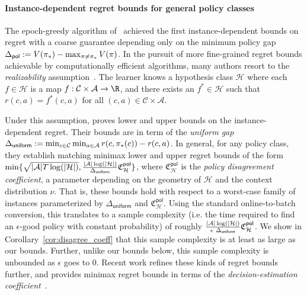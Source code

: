 \documentclass{article}
\newcommand{\mc}[1]{\mathcal{#1}}
\newcommand{\1}{\mathbf{1}}
\renewcommand{\v}{r} %
\begin{document}
\paragraph{Instance-dependent regret bounds for general policy classes}
The epoch-greedy algorithm of~\cite{langford2007epoch} achieved the first instance-dependent bounds on regret with a coarse guarantee depending only on the minimum policy gap 
$\Delta_{\sf pol} := V(\pi_{\ast}) - \max_{\pi \neq \pi_{\ast}}V(\pi)$.
In the pursuit of more fine-grained regret bounds achievable by computationally efficient algorithms, many authors resort to the 
\textit{realizability} assumption~\cite{foster2018practical, foster2020beyond,simchi2021bypassing, foster2021instance}.
The learner knows a hypothesis class $\mc{H}$ where each $f \in \mc{H}$ is a map $f: \mc{C} \times \mc{A} \rightarrow \R$,
and there exists an  $f^{\ast}\in\mc{H}$ such that $\v(c,a) = f^{\ast}(c,a)$ for all $(c,a) \in \mc{C} \times \mc{A}$. 

Under this assumption, \cite{foster2021instance} proves lower and upper bounds on the instance-dependent regret. Their bounds are in term of the \textit{uniform gap} $\Delta_{\sf uniform} := \min_{c\in \mc{C}} \min_{a \in \mc{A}} \v(c,\pi_{\ast}(c)) - \v(c,a)$. 
In general, for any policy class, they establish matching minimax lower and upper regret bounds of the form $\min\{\sqrt{|\mathcal{A}|T\log(|\mc{H}|)}, \frac{|\mc{A}| \log( |\mc{H}|)}{\Delta_{\sf uniform}} \mathfrak{C}_{\mc{H}}^{\mathsf{pol}}\}$, 
where $\mathfrak{C}_{\mc{H}}^{\mathsf{pol}}$ is the \textit{policy disagreement coefficient}, a parameter depending on the geometry of $\mc{H}$ and the context distribution $\nu$. 
That is, these bounds hold with respect to a worst-case family of instances parameterized by $\Delta_{\textsf{uniform}}$ and $\mathfrak{C}_{\mc{H}}^{\mathsf{pol}}$.
Using the standard online-to-batch conversion, this translates to a sample complexity (i.e. the time required to find an $\epsilon$-good policy with constant probability) of roughly $\frac{|\mc{A}| \log( |\mc{H}|)}{\epsilon \ \Delta_{\sf uniform}}\mathfrak{C}_{\mc{H}}^{\mathsf{pol}}$. We show in Corollary~\ref{cor:disagree_coeff} that this sample complexity is at least as large as our bounds. 
Further, unlike our bounds below, this sample complexity is unbounded as $\epsilon$ goes to $0$. Recent work refines these kinds of regret bounds further, and provides minimax regret bounds in terms of the \textit{decision-estimation coefficient}~\cite{foster2021statistical}.
\end{document}
